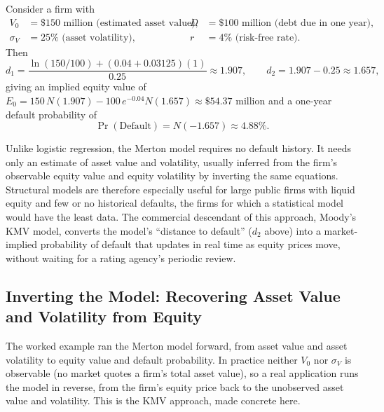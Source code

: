 \documentclass[../ai_in_finance]{subfiles}
\begin{document}
Consider a firm with
\begin{align*}
V_0 &= \$150 \text{ million (estimated asset value)}, & D &= \$100 \text{ million (debt due in one year)}, \\
\sigma_V &= 25\% \text{ (asset volatility)}, & r &= 4\% \text{ (risk-free rate)}.
\end{align*}
Then
\begin{equation*}
d_1 = \frac{\ln(150/100) + (0.04+0.03125)(1)}{0.25} \approx 1.907, \qquad d_2 = 1.907 - 0.25 \approx 1.657,
\end{equation*}
giving an implied equity value of $E_0 = 150\,N(1.907) - 100\,e^{-0.04}N(1.657) \approx \$54.37$ million and a one-year default probability of
\begin{equation*}
\Pr(\text{Default}) = N(-1.657) \approx 4.88\%.
\end{equation*}

Unlike logistic regression, the Merton model requires no default history. It needs only an estimate of asset value and volatility, usually inferred from the firm's observable equity value and equity volatility by inverting the same equations. Structural models are therefore especially useful for large public firms with liquid equity and few or no historical defaults, the firms for which a statistical model would have the least data.
The commercial descendant of this approach, Moody's KMV model, converts the model's ``distance to default'' ($d_2$ above) into a market-implied probability of default that updates in real time as equity prices move, without waiting for a rating agency's periodic review.

\subsection{Inverting the Model: Recovering Asset Value and Volatility from Equity}

The worked example ran the Merton model forward, from asset value and asset volatility to equity value and default probability. In practice neither $V_0$ nor $\sigma_V$ is observable (no market quotes a firm's total asset value), so a real application runs the model in reverse, from the firm's equity price back to the unobserved asset value and volatility. This is the KMV approach, made concrete here.
\end{document}
